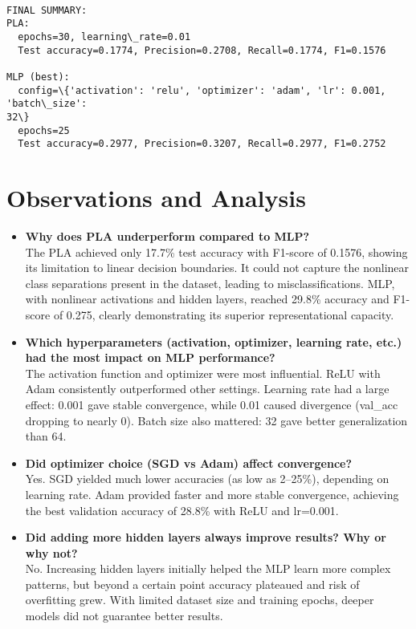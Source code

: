 \documentclass[11pt]{article}
\begin{document}
    \begin{Verbatim}[commandchars=\\\{\}]

FINAL SUMMARY:
PLA:
  epochs=30, learning\_rate=0.01
  Test accuracy=0.1774, Precision=0.2708, Recall=0.1774, F1=0.1576

MLP (best):
  config=\{'activation': 'relu', 'optimizer': 'adam', 'lr': 0.001, 'batch\_size':
32\}
  epochs=25
  Test accuracy=0.2977, Precision=0.3207, Recall=0.2977, F1=0.2752
    \end{Verbatim}
    
\vspace{0.5cm} 
\section{Observations and Analysis} 
\begin{itemize} 
    \item \textbf{Why does PLA underperform compared to MLP?} \\
    The PLA achieved only 17.7\% test accuracy with F1-score of 0.1576, showing its limitation to linear decision boundaries. It could not capture the nonlinear class separations present in the dataset, leading to misclassifications. MLP, with nonlinear activations and hidden layers, reached 29.8\% accuracy and F1-score of 0.275, clearly demonstrating its superior representational capacity.

    \item \textbf{Which hyperparameters (activation, optimizer, learning rate, etc.) had the most impact on MLP performance?} \\
    The activation function and optimizer were most influential. ReLU with Adam consistently outperformed other settings. Learning rate had a large effect: 0.001 gave stable convergence, while 0.01 caused divergence (val\_acc dropping to nearly 0). Batch size also mattered: 32 gave better generalization than 64.

    \item \textbf{Did optimizer choice (SGD vs Adam) affect convergence?} \\
    Yes. SGD yielded much lower accuracies (as low as 2–25\%), depending on learning rate. Adam provided faster and more stable convergence, achieving the best validation accuracy of 28.8\% with ReLU and lr=0.001.

    \item \textbf{Did adding more hidden layers always improve results? Why or why not?} \\
    No. Increasing hidden layers initially helped the MLP learn more complex patterns, but beyond a certain point accuracy plateaued and risk of overfitting grew. With limited dataset size and training epochs, deeper models did not guarantee better results.


\end{itemize}
\end{document}
